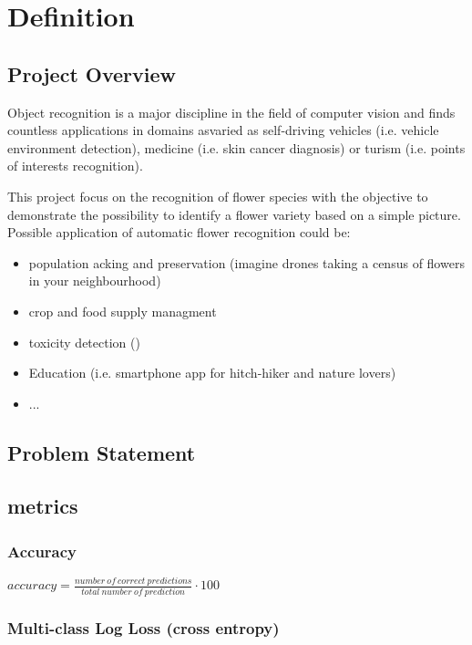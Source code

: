 \section{Definition}

\subsection{Project Overview}

Object recognition is a major discipline in the field of computer vision and finds countless applications in domains asvaried as self-driving vehicles (i.e. vehicle environment detection), medicine (i.e. skin cancer diagnosis) or turism (i.e. points of interests recognition).

This project focus on the recognition of flower species with the objective to demonstrate the possibility to identify a flower variety based on a simple picture. Possible application of automatic flower recognition could be:

\begin{itemize}
	\item population acking and preservation (imagine drones taking a census of flowers in your neighbourhood)
	\item crop and food supply managment 
	\item toxicity detection ()
	\item Education (i.e. smartphone app for hitch-hiker and nature lovers)
	\item ...
	
\end{itemize}

\subsection{Problem Statement}



\subsection{metrics}

\subsubsection{Accuracy}
\begin{center}
	$accuracy = \frac{number \ of \ correct \ predictions}{total \ number \ of \ prediction} \cdot 100$ \\
\end{center}

\subsubsection{Multi-class Log Loss (cross entropy)}
